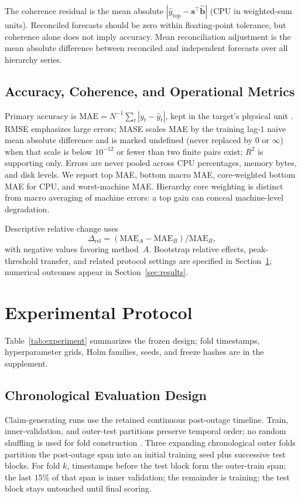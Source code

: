 \documentclass[a4paper,fleqn]{cas-dc}
\begin{document}
The coherence residual is the mean absolute
$|\hat{y}_{\mathrm{top}}-\mathbf{s}^{\top}\hat{\mathbf{b}}|$
({CPU} in weighted-sum units).
Reconciled forecasts should be zero within floating-point tolerance, but
coherence alone does not imply accuracy.
Mean reconciliation adjustment is the mean absolute difference between
reconciled and independent forecasts over all hierarchy series.

\subsection{Accuracy, Coherence, and Operational Metrics}
\label{sec:metrics}
Primary accuracy is
$\mathrm{MAE}=N^{-1}\sum_t|y_t-\hat{y}_t|$,
kept in the target's physical unit \cite{hyndman2006accuracy}.
{RMSE} emphasizes large errors;
{MASE} scales {MAE} by the training lag-$1$ naive mean absolute difference and
is marked undefined (never replaced by $0$ or $\infty$) when that scale is below
$10^{-12}$ or fewer than two finite pairs exist;
$R^2$ is supporting only.
Errors are never pooled across {CPU} percentages, memory bytes, and disk levels.
We report top {MAE}, bottom macro {MAE}, core-weighted bottom {MAE} for {CPU},
and worst-machine {MAE}.
Hierarchy core weighting is distinct from macro averaging of machine errors: a
top gain can conceal machine-level degradation.

Descriptive relative change uses
\begin{equation*}
\Delta_{\mathrm{rel}}
=
(\mathrm{MAE}_A-\mathrm{MAE}_B)/\mathrm{MAE}_B,
\end{equation*}
with negative values favoring method~$A$.
Bootstrap relative effects, peak-threshold transfer, and related protocol
settings are specified in Section~\ref{sec:protocol}; numerical outcomes appear
in Section~\ref{sec:results}.

\section{Experimental Protocol}
\label{sec:protocol}

Table~\ref{tab:experiment} summarizes the frozen design; fold timestamps,
hyperparameter grids, Holm families, seeds, and freeze hashes are in the
supplement.


\FloatBarrier

\subsection{Chronological Evaluation Design}
Claim-generating runs use the retained continuous post-outage timeline.
Train, inner-validation, and outer-test partitions preserve temporal order; no
random shuffling is used for fold construction
\cite{bergmeir2018note}.
Three expanding chronological outer folds partition the post-outage span into an
initial training seed plus successive test blocks.
For fold $k$, timestamps before the test block form the outer-train span; the
last $15\%$ of that span is inner validation; the remainder is training; the test
block stays untouched until final scoring.
\end{document}

